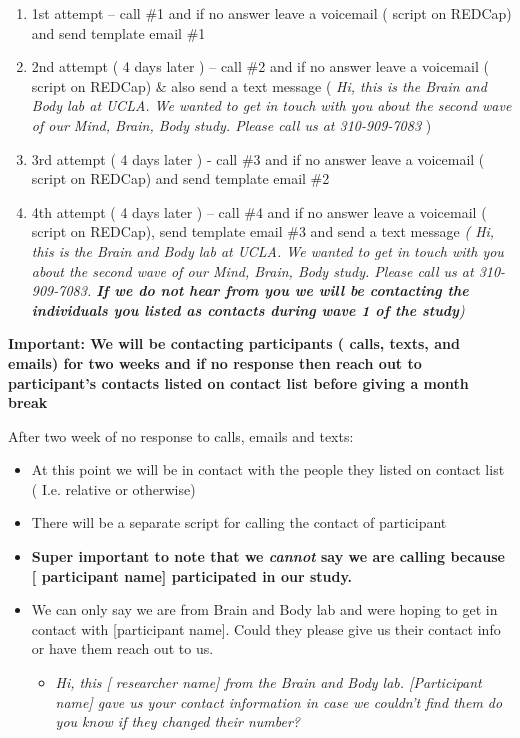 \documentclass[]{book}
\providecommand{\tightlist}{%
  \setlength{\itemsep}{0pt}\setlength{\parskip}{0pt}}
\begin{document}
\begin{enumerate}
\def\labelenumi{\arabic{enumi})}
\tightlist
\item
  1st attempt -- call \#1 and if no answer leave a voicemail ( script on REDCap) and send template email \#1
\item
  2nd attempt ( 4 days later ) -- call \#2 and if no answer leave a voicemail ( script on REDCap) \& also send a text message ( \emph{Hi, this is the Brain and Body lab at UCLA. We wanted to get in touch with you about the second wave of our Mind, Brain, Body study. Please call us at 310-909-7083} )
\item
  3rd attempt ( 4 days later ) - call \#3 and if no answer leave a voicemail ( script on REDCap) and send template email \#2
\item
  4th attempt ( 4 days later ) -- call \#4 and if no answer leave a voicemail ( script on REDCap), send template email \#3 and send a text message \emph{( Hi, this is the Brain and Body lab at UCLA. We wanted to get in touch with you about the second wave of our Mind, Brain, Body study. Please call us at 310-909-7083. \textbf{If we do not hear from you we will be contacting the individuals you listed as contacts during wave 1 of the study})}
\end{enumerate}

\textbf{Important: We will be contacting participants ( calls, texts, and emails) for two weeks and if no response then reach out to participant's contacts listed on contact list before giving a month break}

After two week of no response to calls, emails and texts:

\begin{itemize}
\item
  At this point we will be in contact with the people they listed on contact list ( I.e. relative or otherwise)
\item
  There will be a separate script for calling the contact of participant
\item
  \textbf{Super important to note that we \emph{cannot} say we are calling because {[} participant name{]} participated in our study.}
\item
  We can only say we are from Brain and Body lab and were hoping to get in contact with {[}participant name{]}. Could they please give us their contact info or have them reach out to us.

  \begin{itemize}
  \tightlist
  \item
    \emph{Hi, this {[} researcher name{]} from the Brain and Body lab. {[}Participant name{]} gave us your contact information in case we couldn't find them do you know if they changed their number?}
  \end{itemize}
\end{itemize}
\end{document}
